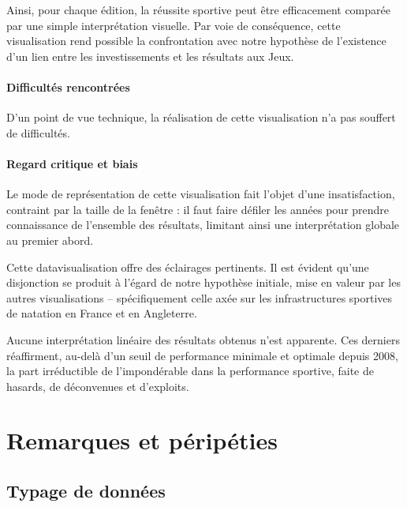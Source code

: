 \documentclass[hidelinks, 12pt]{report}
\begin{document}
Ainsi, pour chaque édition, la réussite sportive peut être efficacement comparée par une simple interprétation visuelle. Par voie de conséquence, cette visualisation rend possible la confrontation avec notre hypothèse de l'existence d'un lien entre les investissements et les résultats aux Jeux.

\subsubsection{Difficultés rencontrées}

D’un point de vue technique, la réalisation de cette visualisation n’a pas souffert de difficultés.

\subsubsection{Regard critique et biais}

Le mode de représentation de cette visualisation fait l'objet d'une insatisfaction, contraint par la taille de la fenêtre : il faut faire défiler les années pour prendre connaissance de l'ensemble des résultats, limitant ainsi une interprétation globale au premier abord.

Cette datavisualisation offre des éclairages pertinents. Il est évident qu'une disjonction se produit à l'égard de notre hypothèse initiale, mise en valeur par les autres visualisations -- spécifiquement celle axée sur les infrastructures sportives de natation en France et en Angleterre.

Aucune interprétation linéaire des résultats obtenus n'est apparente. Ces derniers réaffirment, au-delà d'un seuil de performance minimale et optimale depuis 2008, la part irréductible de l'impondérable dans la performance sportive, faite de hasards, de déconvenues et d'exploits.





%





\chapter{Remarques et péripéties}

\section{Typage de données}
\end{document}
